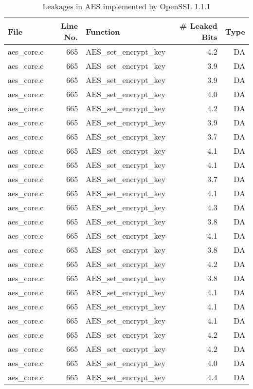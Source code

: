 \begin{table}[h!]
\centering\tiny\scriptsize
\renewcommand{\baselinestretch}{0.96}\selectfont
\caption{Leakages in AES implemented by OpenSSL 1.1.1}\label{tab:AESOpenSSL1.1.1}
\begin{tabular}{lrlrr}
\hline
\textbf{File} & \textbf{Line No.} & \textbf{Function} & \textbf{\# Leaked Bits} & \textbf{Type} \\\hline
aes\_core.c& 665&AES\_set\_encrypt\_key&4.2 &DA\\
aes\_core.c& 665&AES\_set\_encrypt\_key&3.9 &DA\\
aes\_core.c& 665&AES\_set\_encrypt\_key&3.9 &DA\\
aes\_core.c& 665&AES\_set\_encrypt\_key&4.0 &DA\\
aes\_core.c& 665&AES\_set\_encrypt\_key&4.2 &DA\\
aes\_core.c& 665&AES\_set\_encrypt\_key&3.9 &DA\\
aes\_core.c& 665&AES\_set\_encrypt\_key&3.7 &DA\\
aes\_core.c& 665&AES\_set\_encrypt\_key&4.1 &DA\\
aes\_core.c& 665&AES\_set\_encrypt\_key&4.1 &DA\\
aes\_core.c& 665&AES\_set\_encrypt\_key&3.7 &DA\\
aes\_core.c& 665&AES\_set\_encrypt\_key&4.1 &DA\\
aes\_core.c& 665&AES\_set\_encrypt\_key&4.3 &DA\\
aes\_core.c& 665&AES\_set\_encrypt\_key&3.8 &DA\\
aes\_core.c& 665&AES\_set\_encrypt\_key&4.1 &DA\\
aes\_core.c& 665&AES\_set\_encrypt\_key&3.8 &DA\\
aes\_core.c& 665&AES\_set\_encrypt\_key&4.2 &DA\\
aes\_core.c& 665&AES\_set\_encrypt\_key&3.8 &DA\\
aes\_core.c& 665&AES\_set\_encrypt\_key&4.1 &DA\\
aes\_core.c& 665&AES\_set\_encrypt\_key&4.1 &DA\\
aes\_core.c& 665&AES\_set\_encrypt\_key&4.1 &DA\\
aes\_core.c& 665&AES\_set\_encrypt\_key&4.2 &DA\\
aes\_core.c& 665&AES\_set\_encrypt\_key&4.2 &DA\\
aes\_core.c& 665&AES\_set\_encrypt\_key&4.0 &DA\\
aes\_core.c& 665&AES\_set\_encrypt\_key&4.4 &DA\\

\end{tabular}
\end{table}
